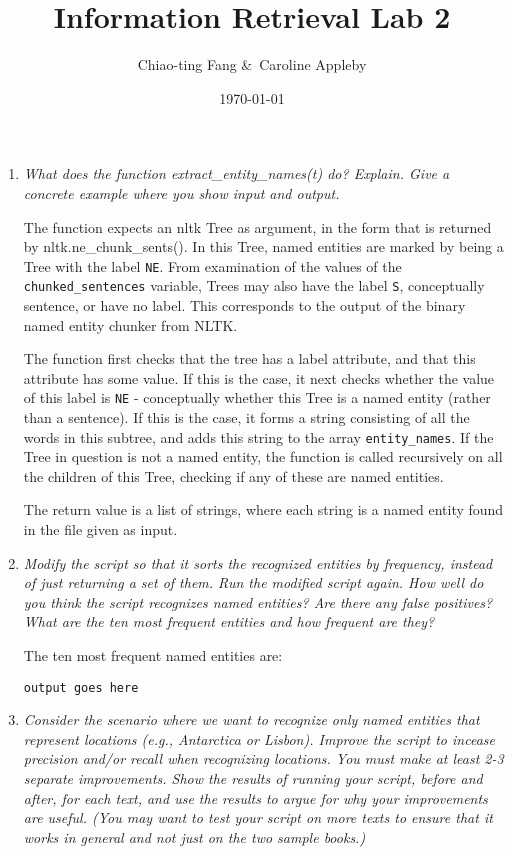 \documentclass{article}
\title{Information Retrieval Lab 2}
\author{Chiao-ting Fang \&\ Caroline Appleby}
\date{\today}
\begin{document}
\maketitle

\begin{enumerate}
\item \emph{What does the function extract_entity_names(t) do?  Explain.  Give a concrete example where you show input and output.}

The function expects an nltk Tree as argument, in the form that is returned by nltk.ne_chunk_sents(). In this Tree, named entities are marked by being a Tree with the label \texttt{NE}. From examination of the values of the \texttt{chunked_sentences} variable, Trees may also have the label \texttt{S}, conceptually sentence, or have no label. This corresponds to the output of the binary named entity chunker from NLTK. 

The function first checks that the tree has a label attribute, and that this attribute has some value.  If this is the case,  it next checks whether the value of this label is \texttt{NE} - conceptually whether this Tree is a named entity (rather than a sentence). If this is the case, it forms a string consisting of all the words in this subtree, and adds this string to the array \texttt{entity_names}. If the Tree in question is not a named entity, the function is called recursively on all the children of this Tree, checking if any of these are named entities.

The return value is a list of strings, where each string is a named entity found in the file given as input. 



\item \emph{Modify the script so that it sorts the recognized entities by frequency, instead of just returning a set of them.  Run the modified script again. How well do you think the script recognizes named entities?  Are there any false positives?  What are the ten most frequent entities and how frequent are they?}

The ten most frequent named entities are:
\begin{verbatim}
output goes here
\end{verbatim}


\item \emph{Consider the scenario where we want to recognize only named entities that represent locations (e.g., Antarctica or Lisbon).  Improve the script to incease precision and/or recall when recognizing locations.  You must make at least 2-3 separate improvements. Show the results of running your script, before and after, for each text, and use the results to argue for why your improvements are useful.  (You may want to test your script on more texts to ensure that it works in general and not just on the two sample books.)}


\end{enumerate}
\end{document}
